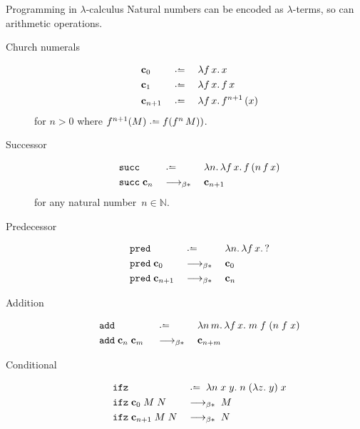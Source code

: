 \begin{frame}[allowframebreaks]{Programming in $\lambda$-calculus}
\framebreak
  Natural numbers can be encoded as $\lambda$-terms, so can arithmetic operations. 
  \begin{description}
    \item[Church numerals] 
      \begin{align*}
        &\bc_0 &&\defeq\;&& \lambda f\,x.\, x \\
        &\bc_{1} &&\defeq\;&& \lambda f\,x.\, f\,x \\
        &\bc_{n+1} &&\defeq\;&& \lambda f\,x.\, f^{n+1}\,(x)
      \end{align*}
      for $n > 0$ where $f^{n+1}(M)  \defeq f (f^n\, M))$.
    \item[Successor]
      \begin{align*}
        & \mathtt{succ} && \defeq\; && \lambda n.\,\lambda f\,x.\, f\,(n\,f\,x) \\
        & \mathtt{succ}\;\bc_n && \reduce\; && \bc_{n+1}
      \end{align*}
      for any natural number~$n \in \mathbb{N}$.
    \item[Predecessor]
      \begin{align*}
        & \mathtt{pred} && \defeq\; && \lambda n.\, \lambda f\,x.\, ? \\
        & \mathtt{pred}\;\bc_{0}  && \reduce\; && \bc_{0} \\
        & \mathtt{pred}  \;\bc_{n+1} && \reduce\; && \bc_{n}
      \end{align*}
    \item[Addition]
      \begin{align*}
        & \mathtt{add} && \defeq\; && \lambda n\,m.\,\lambda f\,x.\;
        m\;f\;(n\;f\;x)  \\ & \mathtt{add}\;\bc_{n}\;\bc_{m}\;
                            && \reduce\; && \bc_{n + m}
      \end{align*}
    \item[Conditional]
      \begin{align*}
        & \mathtt{ifz} && \defeq \; \lambda n\;x\;y.\;n\;(\lambda z.\;y)\;x 
        \\
        & \mathtt{ifz}\;\bc_0\;M\;N && \reduce \; M \\
        & \mathtt{ifz}\;\bc_{n+1}\;M\;N && \reduce \; N
      \end{align*}
  \end{description}
  \framebreak


\end{frame}
